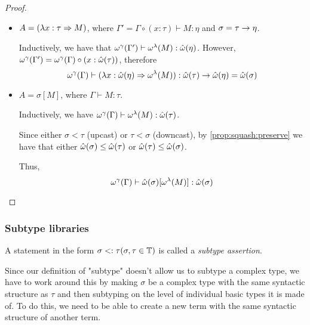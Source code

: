 \documentclass[main.tex]{subfiles}
\begin{document}
\begin{proof}
\begin{itemize}
        \item $A = (\lambda x : \tau \Rightarrow M)$, where $\Gamma' = \Gamma \circ
            (x : \tau) \vdash M : \eta$ and $\sigma = \tau \rightarrow \eta$.

            Inductively, we have that $\omega^{\gamma}(\Gamma') \vdash \omega^{\lambda}(M) : \hat{\omega}(\eta)$.
            However, $\omega^{\gamma}(\Gamma') = \omega^{\gamma}(\Gamma) \circ (x : \hat{\omega}(\tau))$,
            therefore \[ \omega^{\gamma}(\Gamma) \vdash (\lambda x : \hat{\omega}(\eta)
                \Rightarrow \omega^{\lambda}(M)) : \hat{\omega}(\tau) \rightarrow \hat{\omega}(\eta) = \hat{\omega}(\sigma) \]

        \item $A = \sigma[M]$, where $\Gamma \vdash M : \tau$.

            Inductively, we have $\omega^{\gamma}(\Gamma) \vdash \omega^{\lambda}(M) : \hat{\omega}(\tau)$.

            Since either $\sigma \less \tau$ (upcast) or $\tau \less \sigma$
            (downcast), by \cref{prop:squash:preserve} we have that either
            $\hat{\omega}(\sigma) \leq \hat{\omega}(\tau)$ or $\hat{\omega}(\tau) \leq \hat{\omega}(\sigma)$.

            Thus, \[
                \omega^{\gamma}(\Gamma) \vdash \hat{\omega}(\sigma)[\omega^{\lambda}(M)] : \hat{\omega}(\sigma)
            \]
    \end{itemize}
\end{proof}

\subsubsection{Subtype libraries}
\begin{defn}
    A statement in the form $\sigma <: \tau (\sigma, \tau \in \mathbb{T})$
    is called a \emph{subtype assertion}.
\end{defn}

Since our definition of "subtype" doesn't allow us to subtype a complex type,
we have to work around this by making $\sigma$ be a complex type with the same
syntactic structure as $\tau$ and then subtyping on the level of individual
basic types it is made of. To do this, we need to be able to create a new term
with the same syntactic structure of another term.

\end{document}
